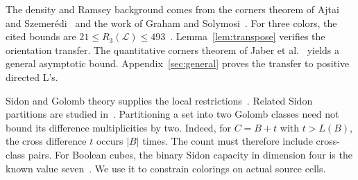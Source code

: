 \documentclass[11pt,a4paper]{article}
\theoremstyle{definition}
\newcommand{\Lconf}{\mathcal L}
\numberwithin{equation}{section}
\begin{document}
The density and Ramsey background comes from the corners theorem of Ajtai and Szemer\'edi~\cite{AS74} and the work of Graham and Solymosi~\cite{GS06}. For three colors, the cited bounds are $21\le R_3(\Lconf)\le493$~\cite{CCFGMS23,MSY25}. Lemma~\ref{lem:transpose} verifies the orientation transfer. The quantitative corners theorem of Jaber et al.~\cite{JLLOS25} yields a general asymptotic bound. Appendix~\ref{sec:general} proves the transfer to positive directed L's.

Sidon and Golomb theory supplies the local restrictions~\cite{OB04,D09,TV06}. Related Sidon partitions are studied in~\cite{ESR24}. Partitioning a set into two Golomb classes need not bound its difference multiplicities by two. Indeed, for $C=B+t$ with $t>L(B)$, the cross difference $t$ occurs $|B|$ times. The count must therefore include cross-class pairs. For Boolean cubes, the binary Sidon capacity in dimension four is the known value seven~\cite{OEIS309370,Wood05}. We use it to constrain colorings on actual source cells.
\end{document}
